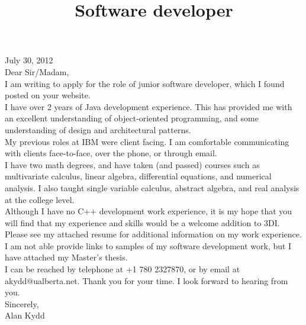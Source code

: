 \documentclass[11pt,letterpaper,sans]{moderncv}   %
\title{Software developer}               %
\begin{document}
\maketitle
\begin{flushleft}
July 30, 2012\\[0.5cm]
Dear Sir/Madam,\\[0.5cm]

I am writing to apply for the role of junior software developer, which I found
posted on your website.
\\[0.5cm]

I have over 2 years of Java development experience.  This has provided
me with an excellent understanding of object-oriented programming,
and some understanding of design and architectural patterns.\\[0.5cm]

My previous roles at IBM were client facing.  I am comfortable communicating
with clients face-to-face, over the phone, or through email.
\\[0.5cm]

I have two math degrees, and have taken (and passed) courses such as
multivariate calculus, linear algebra, differential equations, and numerical
analysis.  I also taught single variable calculus, abstract algebra, and real
analysis at the college level.\\[0.5cm]

Although I have no C++ development work experience, it is my hope that you
will find that my experience and skills would be a welcome addition to 3DI.\\[0.5cm]

Please see my attached resume for additional information on my work
experience.  I am not able provide links to samples of my software development
work, but I have attached my Master's thesis.\\[0.5cm]

I can be reached by telephone at +1 780 2327870, or by email at
akydd@ualberta.net.  Thank you for your time.  I look forward to hearing
from you.\\[1.5cm]

Sincerely,\\[0.5cm]
Alan Kydd
\end{flushleft}
\end{document}
